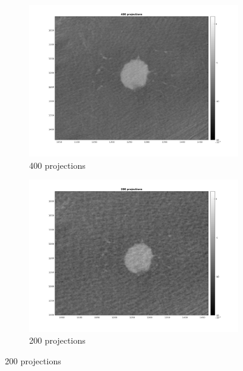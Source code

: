 \documentclass[10pt,a4paper,titlepage]{article}
\begin{document}
\begin{figure}[h!]
\begin{subfigure}[b]{0.475\textwidth}
            \centering 
            \includegraphics[width=\textwidth]{proj/ZOOMED/400.png}  
            \caption{400 projections}
            \label{400Z}
        \end{subfigure}
        \quad
        \begin{subfigure}[b]{0.475\textwidth}   
            \centering 
            \includegraphics[width=\textwidth]{proj/ZOOMED/200.png}   
            \caption{200 projections}
            \label{200Z}
        \end{subfigure}
        

\end{figure}
\end{document}
